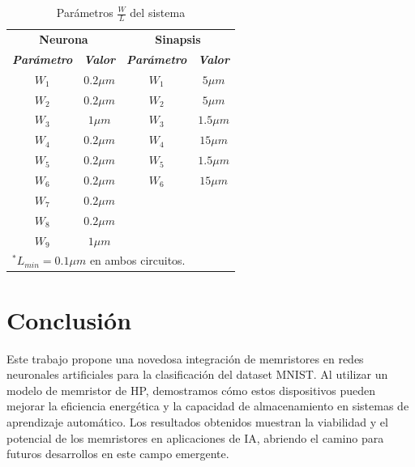 \documentclass[conference]{IEEEtran}
\begin{document}
\begin{table}[htbp]
\caption{Parámetros $\frac{W}{L}$ del sistema}
\begin{center}
\begin{tabular}{|c|c|c|c|}
\hline
\multicolumn{2}{|c|}{\textbf{Neurona}}&\multicolumn{2}{|c|}{\textbf{Sinapsis}} \\
\cline{1-4} 
\textbf{\textit{Parámetro}} & \textbf{\textit{Valor}}& \textbf{\textit{Parámetro}}& \textbf{\textit{Valor}} \\
\hline
$W_{1}$ & $0.2\mu m$ & $W_{1}$ & $5\mu m$\\
\hline
$W_{2}$ & $0.2\mu m$ & $W_{2}$ & $5\mu m$\\
\hline
$W_{3}$ & $1\mu m$ & $W_{3}$ & $1.5\mu m$\\
\hline
$W_{4}$ & $0.2\mu m$ & $W_{4}$ & $15\mu m$\\
\hline
$W_{5}$ & $0.2\mu m$ & $W_{5}$ & $1.5\mu m$\\
\hline
$W_{6}$ & $0.2\mu m$ & $W_{6}$ & $15\mu m$\\
\hline
$W_{7}$ & $0.2\mu m$ & & \\
\hline
$W_{8}$ & $0.2\mu m$ & & \\
\hline
$W_{9}$ & $1\mu m$ & & \\
\hline
\multicolumn{4}{l}{$^{*}$$L_{min}=0.1\mu m$ en ambos circuitos.}
\end{tabular}
\label{parametros}
\end{center}
\end{table}

\section*{Conclusión}

Este trabajo propone una novedosa integración de memristores en redes neuronales artificiales para la clasificación del dataset MNIST. Al utilizar un modelo de memristor de HP, demostramos cómo estos dispositivos pueden mejorar la eficiencia energética y la capacidad de almacenamiento en sistemas de aprendizaje automático. Los resultados obtenidos muestran la viabilidad y el potencial de los memristores en aplicaciones de IA, abriendo el camino para futuros desarrollos en este campo emergente.



\end{document}
